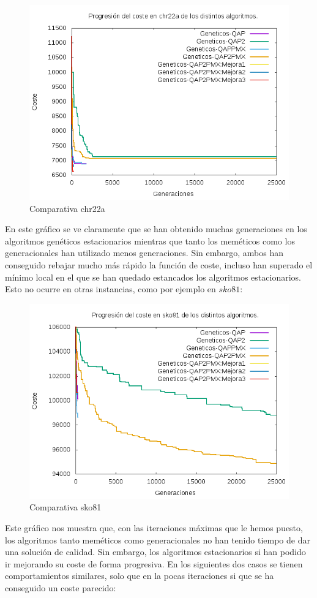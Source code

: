 \begin{figure}[H]
	\centering
	\includegraphics[width=0.7\linewidth]{graficos/comparativachr22a}
	\caption[Comparativa chr22a]{Comparativa chr22a}
	\label{fig:comparativachr22a}
\end{figure}

En este gráfico se ve claramente que se han obtenido muchas generaciones en los algoritmos genéticos estacionarios mientras que tanto los meméticos como los generacionales han utilizado menos generaciones. Sin embargo, ambos han conseguido rebajar mucho más rápido la función de coste, incluso han superado el mínimo local en el que se han quedado estancados los algoritmos estacionarios.\\

Esto no ocurre en otras instancias, como por ejemplo en $sko81$:\\

\begin{figure}[H]
	\centering
	\includegraphics[width=0.7\linewidth]{graficos/comparativasko81}
	\caption[Comparativa sko81]{Comparativa sko81}
	\label{fig:comparativasko81}
\end{figure}

Este gráfico nos muestra que, con las iteraciones máximas que le hemos puesto, los algoritmos tanto meméticos como generacionales no han tenido tiempo de dar una solución de calidad. Sin embargo, los algoritmos estacionarios si han podido ir mejorando su coste de forma progresiva. En los siguientes dos casos se tienen comportamientos similares, solo que en la pocas iteraciones si que se ha conseguido un coste parecido:\\

